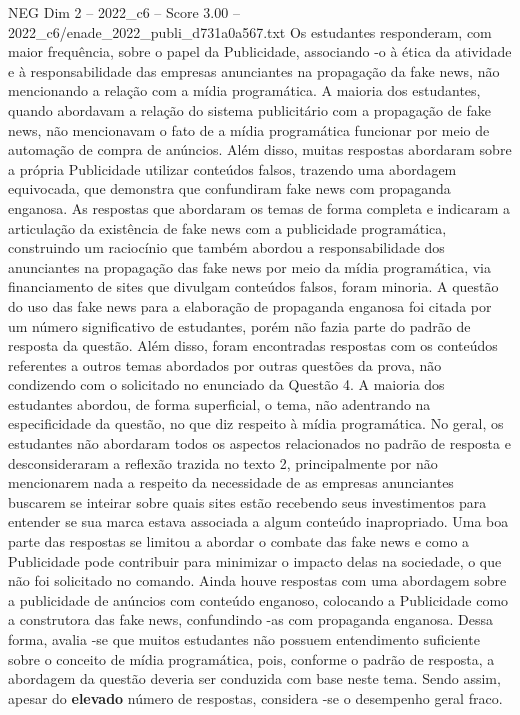 \begin{textsample}{NEG Dim 2 – 2022\_c6 – Score 3.00 – 2022\_c6/enade\_2022\_publi\_d731a0a567.txt}
Os estudantes responderam, com maior frequência, sobre o papel da Publicidade, associando -o à ética da atividade e à responsabilidade das empresas anunciantes na propagação da fake news, não mencionando a relação com a mídia programática.
A maioria dos estudantes, quando abordavam a relação do sistema publicitário com a propagação de fake news, não mencionavam o fato de a mídia programática funcionar por meio de automação de compra de anúncios.
Além disso, muitas respostas abordaram sobre a própria Publicidade utilizar conteúdos falsos, trazendo uma abordagem equivocada, que demonstra que confundiram fake news com propaganda enganosa.
As respostas que abordaram os temas de forma completa e indicaram a articulação da existência de fake news com a publicidade programática, construindo um raciocínio que também abordou a responsabilidade dos anunciantes na propagação das fake news por meio da mídia programática, via financiamento de sites que divulgam conteúdos falsos, foram minoria.
A questão do uso das fake news para a elaboração de propaganda enganosa foi citada por um número significativo de estudantes, porém não fazia parte do padrão de resposta da questão.
Além disso, foram encontradas respostas com os conteúdos referentes a outros temas abordados por outras questões da prova, não condizendo com o solicitado no enunciado da Questão 4.
A maioria dos estudantes abordou, de forma superficial, o tema, não adentrando na especificidade da questão, no que diz respeito à mídia programática.
No geral, os estudantes não abordaram todos os aspectos relacionados no padrão de resposta e desconsideraram a reflexão trazida no texto 2, principalmente por não mencionarem nada a respeito da necessidade de as empresas anunciantes buscarem se inteirar sobre quais sites estão recebendo seus investimentos para entender se sua marca estava associada a algum conteúdo inapropriado.
Uma boa parte das respostas se limitou a abordar o combate das fake news e como a Publicidade pode contribuir para minimizar o impacto delas na sociedade, o que não foi solicitado no comando.
Ainda houve respostas com uma abordagem sobre a publicidade de anúncios com conteúdo enganoso, colocando a Publicidade como a construtora das fake news, confundindo -as com propaganda enganosa.
Dessa forma, avalia -se que muitos estudantes não possuem entendimento suficiente sobre o conceito de mídia programática, pois, conforme o padrão de resposta, a abordagem da questão deveria ser conduzida com base neste tema.
Sendo assim, apesar do \textbf{elevado} número de respostas, considera -se o desempenho geral fraco.

\end{textsample}

